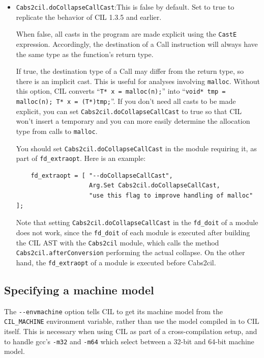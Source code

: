 \documentclass[letterpaper]{article}
\def\t#1{{\tt #1}}
\begin{document}
\begin{itemize}
\item \t{Cabs2cil.doCollapseCallCast}:This is false by default.  Set
to true to replicate the behavior of CIL 1.3.5 and earlier.

When false, all casts in the program are made explicit using the
\t{CastE} expression. Accordingly, the destination of a Call
instruction will always have the same type as the function's return
type.

If true, the destination type of a Call may differ from the return type, so
there is an implicit cast.  This is useful for analyses involving
\t{malloc}.  Without this option, CIL converts ``\t{T* x = malloc(n);}''
into ``\t{void* tmp = malloc(n); T* x = (T*)tmp;}''.  If you don't
need all casts to be made explicit, you can set
\t{Cabs2cil.doCollapseCallCast} to true so that CIL won't insert a
temporary and you can more easily determine the allocation type from
calls to \t{malloc}.

You should set \t{Cabs2cil.doCollapseCallCast} in the module requiring it,
as part of \t{fd\_extraopt}. Here is an example:
\begin{verbatim}
    fd_extraopt = [ "--doCollapseCallCast",
                    Arg.Set Cabs2cil.doCollapseCallCast,
                    "use this flag to improve handling of malloc" ];
\end{verbatim}

Note that setting \t{Cabs2cil.doCollapseCallCast} in the \t{fd\_doit} of a
module does not work, since the \t{fd\_doit} of each module is executed after
building the CIL AST with the \t{Cabs2cil} module, which calls the method
\t{Cabs2cil.afterConversion} performing the actual collapse.  On the other hand,
the \t{fd\_extraopt} of a module is executed before Cabs2cil.

\end{itemize}

\subsection{Specifying a machine model}
\label{sec-cilmachine}

The \t{-{}-envmachine} option tells CIL to get its machine model from
the \t{CIL\_MACHINE} environment variable, rather than use the model
compiled in to CIL itself. This is necessary when using CIL as part of
a cross-compilation setup, and to handle gcc's \t{-m32} and \t{-m64}
which select between a 32-bit and 64-bit machine model.
\end{document}
